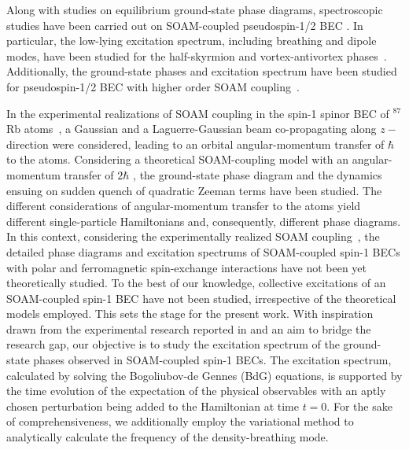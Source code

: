 \documentclass[pra,twocolumn,aps,superscriptaddress,showpacs,longbibliography]{revtex4-1}
\begin{document}
Along with studies on equilibrium ground-state phase diagrams, spectroscopic studies have been carried out on SOAM-coupled pseudospin-1/2 BEC 
\cite{chen2020angular,vasic2016excitation,chen2020ground}. In particular, the low-lying excitation
spectrum, including breathing and dipole modes, have been studied for the half-skyrmion and vortex-antivortex phases~\cite{vasic2016excitation,chen2020angular}.
Additionally, the ground-state phases and excitation spectrum have been studied for 
pseudospin-1/2 BEC with higher order SOAM coupling~\cite{chen2020ground}. 


 In the experimental realizations of SOAM coupling in the spin-1 spinor BEC of $^{87}$Rb atoms~\cite{chen2018spin,chen2018rotating}, a
Gaussian and a Laguerre-Gaussian beam co-propagating along $z-$direction were considered, leading to an orbital angular-momentum transfer of $\hbar$ to the atoms.
Considering a theoretical SOAM-coupling model with an angular-momentum transfer of $2\hbar$ \cite{chen2016spin}, the ground-state phase diagram and the dynamics
ensuing on sudden quench of quadratic Zeeman terms have been studied. The different considerations of angular-momentum transfer to the atoms yield different
single-particle Hamiltonians and, consequently, different phase diagrams. In this context, considering the experimentally realized
SOAM coupling~\cite{chen2018spin,chen2018rotating}, the detailed phase diagrams and excitation spectrums of SOAM-coupled spin-1 BECs with polar and
ferromagnetic spin-exchange interactions have not been yet theoretically studied. To the best of our knowledge, collective excitations
of an SOAM-coupled spin-1 BEC have not been studied, irrespective of the theoretical models employed.
This sets the stage for the present work.
With inspiration drawn from the experimental research reported in \cite{chen2018rotating} and an aim to bridge 
the research gap, our objective is to study the excitation spectrum of the ground-state phases observed in 
SOAM-coupled spin-1 BECs.
The excitation spectrum, calculated by solving the Bogoliubov-de Gennes (BdG) equations, is supported by the time evolution
of the expectation of the physical observables with an aptly chosen perturbation being added to the Hamiltonian at time $t = 0$.
For the sake of comprehensiveness, we additionally employ the variational method to analytically calculate the frequency of the density-breathing mode.
\end{document}
